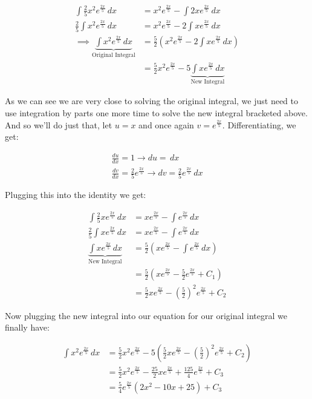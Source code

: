 \documentclass{article}
\begin{document}
\begin{align*}
    \int \frac{2}{5}x^2e^{\frac{2x}{5}}\,dx&=x^2e^{\frac{2x}{5}}-\int 2xe^{\frac{2x}{5}}\,dx\\
    \frac{2}{5}\int x^2e^{\frac{2x}{5}}\,dx&=x^2e^{\frac{2x}{5}}-2\int xe^{\frac{2x}{5}}\,dx\\
    \implies\underbrace{\int x^2e^{\frac{2x}{5}}\,dx}_{\text{Original Integral}}&=\frac{5}{2}(x^2e^{\frac{2x}{5}}-2\int xe^{\frac{2x}{5}}\,dx)\\
    &=\frac{5}{2}x^2e^{\frac{2x}{5}}-5\underbrace{\int xe^{\frac{2x}{5}}\,dx}_{\text{New Integral}}
\end{align*}

As we can see we are very close to solving the original integral, we just need to use integration by parts one more time to solve the new integral bracketed above. And so we'll do just that, let $u=x$ and once again $v=e^{\frac{2x}{5}}$. Differentiating, we get:

\begin{gather*}
    \frac{du}{dx}=1\rightarrow du=\,dx\\
    \frac{dv}{dx}=\frac{2}{5}e^{\frac{2x}{5}}\rightarrow dv=\frac{2}{5}e^{\frac{2x}{5}}\,dx
\end{gather*}

Plugging this into the identity we get:

\begin{align*}
    \int \frac{2}{5}xe^{\frac{2x}{5}}\,dx&=xe^{\frac{2x}{5}}-\int e^{\frac{2x}{5}}\,dx\\
    \frac{2}{5}\int xe^{\frac{2x}{5}}\,dx&=xe^{\frac{2x}{5}}-\int e^{\frac{2x}{5}}\,dx\\
    \underbrace{\int xe^{\frac{2x}{5}}\,dx}_{\text{New Integral}}&=\frac{5}{2}(xe^{\frac{2x}{5}}-\int e^{\frac{2x}{5}}\,dx)\\
    &=\frac{5}{2}(xe^{\frac{2x}{5}}-\frac{5}{2}e^{\frac{2x}{5}}+C_1)\\
    &=\frac{5}{2}xe^{\frac{2x}{5}}-\left(\frac{5}{2}\right)^2e^{\frac{2x}{5}}+C_2
\end{align*}

Now plugging the new integral into our equation for our original integral we finally have:

\begin{align*}
    \int x^2e^{\frac{2x}{5}}\,dx&=\frac{5}{2}x^2e^{\frac{2x}{5}}-5\left(\frac{5}{2}xe^{\frac{2x}{5}}-\left(\frac{5}{2}\right)^2e^{\frac{2x}{5}}+C_2\right)\\
    &=\frac{5}{2}x^2e^{\frac{2x}{5}}-\frac{25}{2}xe^{\frac{2x}{5}}+\frac{125}{4}e^{\frac{2x}{5}}+C_3\\
    &=\frac{5}{4}e^{\frac{2x}{5}}\left(2x^2-10x+25\right)+C_3
\end{align*}
\end{document}
